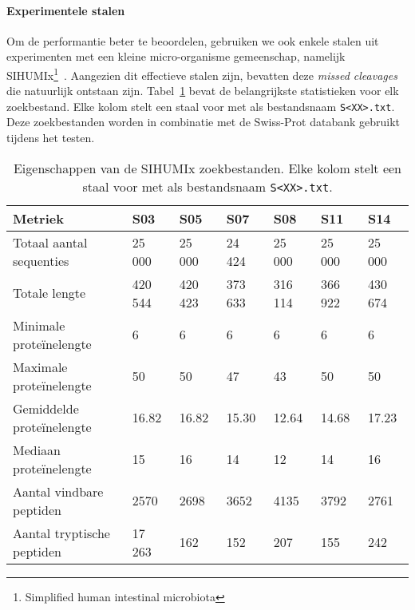 \paragraph{Experimentele stalen}
Om de performantie beter te beoordelen, gebruiken we ook enkele stalen uit experimenten met een kleine micro-organisme gemeenschap, namelijk SIHUMIx\footnote{Simplified human intestinal microbiota}~\cite{SIHUMI_first_introduction, SIHUMI_frequently_used}.
Aangezien dit effectieve stalen zijn, bevatten deze \textit{missed cleavages} die natuurlijk ontstaan zijn.
Tabel~\ref{tab:sihumi_zoekbestanden} bevat de belangrijkste statistieken voor elk zoekbestand.
Elke kolom stelt een staal voor met als bestandsnaam \texttt{S<XX>.txt}.
Deze zoekbestanden worden in combinatie met de Swiss-Prot databank gebruikt tijdens het testen.

\begin{table}[H]
    \centering
    \begin{tabular}{ l l l l l l l }
        Metriek                    & S03     & S05     & S07     & S08     & S11     & S14     \\
        \hline\hline
        Totaal aantal sequenties   & 25 000  & 25 000  & 24 424  & 25 000  & 25 000  & 25 000  \\
        Totale lengte              & 420 544 & 420 423 & 373 633 & 316 114 & 366 922 & 430 674 \\
        Minimale proteïnelengte    & 6       & 6       & 6       & 6       & 6       & 6       \\
        Maximale proteïnelengte    & 50      & 50      & 47      & 43      & 50      & 50      \\
        Gemiddelde proteïnelengte  & 16.82   & 16.82   & 15.30   & 12.64   & 14.68   & 17.23   \\
        Mediaan proteïnelengte     & 15      & 16      & 14      & 12      & 14      & 16      \\
        Aantal vindbare peptiden   & 2570    & 2698    & 3652    & 4135    & 3792    & 2761    \\
        Aantal tryptische peptiden & 17 263  & 162     & 152     & 207     & 155     & 242     \\
        \hline
    \end{tabular}
    \caption{Eigenschappen van de SIHUMIx zoekbestanden. Elke kolom stelt een staal voor met als bestandsnaam \texttt{S<XX>.txt}.}
    \label{tab:sihumi_zoekbestanden}
\end{table}

